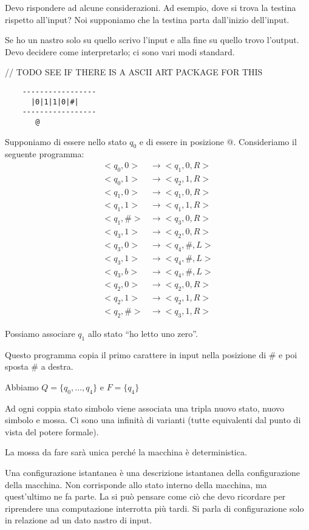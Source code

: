Devo rispondere ad alcune considerazioni. Ad esempio, dove si trova la testina rispetto all'input?
Noi supponiamo che la testina parta dall'inizio dell'input.

Se ho un nastro solo su quello scrivo l'input e alla fine su quello trovo l'output. Devo decidere
come interpretarlo; ci sono vari modi standard.

// TODO SEE IF THERE IS A ASCII ART PACKAGE FOR THIS
\begin{verbatim}
    -----------------
      |0|1|1|0|#|
    -----------------
       @
\end{verbatim}

Supponiamo di essere nello stato $q_{0}$ e di essere in posizione @. Consideriamo il seguente programma:
\begin{align*}
    <q_{0},0> &\to <q_{1},0,R>\\
    <q_{0},1> &\to <q_{2},1,R>\\
    <q_{1},0> &\to <q_{1},0,R>\\
    <q_{1},1> &\to <q_{1},1,R>\\
    <q_{1},\#> &\to <q_{3},0,R>\\
    <q_{3},1> &\to <q_{2},0,R>\\
    <q_{3},0> &\to <q_{4},\#,L>\\
    <q_{3},1> &\to <q_{4},\#,L>\\
    <q_{3},b> &\to <q_{4},\#,L>\\
    <q_{2},0> &\to <q_{2},0,R>\\
    <q_{2},1> &\to <q_{2},1,R>\\
    <q_{2},\#> &\to <q_{3},1,R>
\end{align*}

Possiamo associare $q_{1}$ allo stato ``ho letto uno zero''.

Questo programma copia il primo carattere in input nella posizione di \# e poi sposta \# a destra.

Abbiamo $Q = \{q_{0},\dotsc,q_{4}\}$ e $F = \{q_{4}\}$

Ad ogni coppia stato simbolo viene associata una tripla nuovo stato, nuovo simbolo e mossa. Ci sono
una infinità di varianti (tutte equivalenti dal punto di vista del potere formale).

La mossa da fare sarà unica perché la macchina è deterministica.


Una configurazione istantanea è una descrizione istantanea della configurazione della macchina. Non
corrisponde allo stato interno della macchina, ma quest'ultimo ne fa parte. La si può pensare come
ciò che devo ricordare per riprendere una computazione interrotta più tardi. Si parla di
configurazione solo in relazione ad un dato nastro di input.

